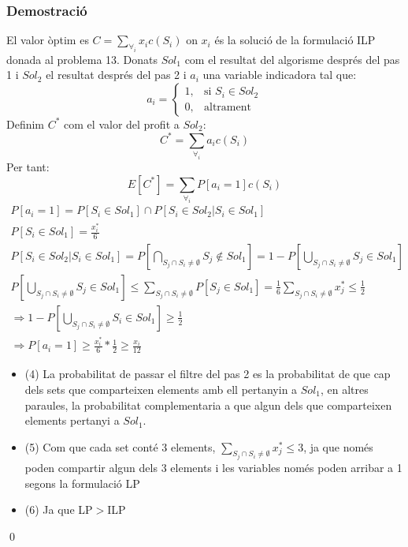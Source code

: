 \subsubsection{Demostració}
El valor òptim es $C=\sum_{\forall_i}x_ic(S_i)$ on $x_i$ és la solució de la formulació ILP donada al problema 13.
Donats $Sol_1$ com el resultat del algorisme després del pas 1 i $Sol_2$ el resultat després del pas 2 i $a_i$ una variable indicadora tal que:
\[
    a_{i} = 
\begin{cases}
    1,  & \text{si } S_i \in Sol_2\\
    0,  & \text{altrament}
\end{cases}
\]
Definim $C^{*}$ com el valor del profit a $Sol_2$:
\[
C^{*} = \sum_{\forall_i} a_i c(S_i)
\]
Per tant:
\[
E[C^{*}]=\sum_{\forall_i}P[a_i=1]c(S_i)
\]
\begin{eqnarray}
    P[a_i=1]=P[S_i \in Sol_1] \cap P[S_i \in Sol_2 | S_i \in Sol_1] \nonumber\\
    P[S_i \in Sol_1] = \frac{x_i^{*}}{6} \nonumber\\
    P[S_i \in Sol_2 | S_i \in Sol_1] = P[\bigcap_{S_j \cap S_i \neq \emptyset}S_j \notin Sol_1] = 1-P[\bigcup_{S_j \cap S_i \neq \emptyset} S_j \in Sol_1]\\
    P[\bigcup_{S_j \cap S_i \neq \emptyset}S_j \in Sol_1] \leq \sum_{S_j \cap S_i \neq \emptyset} P[S_j \in Sol_1] = \frac{1}{6}\sum_{S_j \cap S_i \neq \emptyset} x_j^{*}\leq \frac{1}{2}\\
    \Rightarrow 1-P[\bigcup_{S_j \cap S_i \neq \emptyset} S_i \in Sol_1] \geq \frac{1}{2}\nonumber\\
    \Rightarrow P[a_i=1] \geq \frac{x_i^{*}}{6}*\frac{1}{2}\geq \frac{x_i}{12}
\end{eqnarray}
\begin{itemize}
    \item (4) La probabilitat de passar el filtre del pas 2 es la probabilitat de que cap dels sets que comparteixen elements amb ell pertanyin a $Sol_1$, en altres paraules, la probabilitat complementaria a que algun dels que comparteixen elements pertanyi a $Sol_1$.
    \item (5) Com que cada set conté 3 elements, $\sum_{S_j \cap S_i \neq \emptyset}x_j^{*} \leq 3$, ja que només poden compartir algun dels 3 elements i les variables només poden arribar a 1 segons la formulació LP
    \item (6) Ja que LP$>$ILP
\end{itemize}
\qed